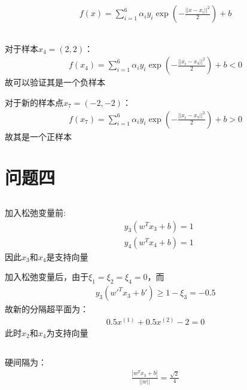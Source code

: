 \documentclass[12pt, a4paper]{article}
\begin{document}
\subsection{}

\begin{align*}
    f(x)=\sum_{i=1}^6 \alpha_i y_i \exp(-\frac{||x-x_i||^2}{2}) +b
\end{align*}

\subsection{}

对于样本$x_4=(2,2)$：
\begin{align*}
    f(x_4)=\sum_{i=1}^{6}\alpha_i y_i \exp(-\frac{||x_i-x_4||^2}{2})+b<0 
\end{align*}
故可以验证其是一个负样本

对于新的样本点$x_7=(-2,-2)$：
\begin{align*}
    f(x_7)=\sum_{i=1}^{6}\alpha_i y_i \exp(-\frac{||x_i-x_7||^2}{2})+b>0
\end{align*}
故其是一个正样本


\section{问题四}


\subsection{}

加入松弛变量前:
\begin{align*}
    &y_3(w^T x_3+b)=1\\
    &y_4(w^T x_4+b)=1
\end{align*}
因此$x_3$和$x_4$是支持向量

加入松弛变量后，由于$\xi_1=\xi_2=\xi_4=0$，而
\begin{align*}
    y_3({w'}^T x_3+b')\geq 1-\xi_3=-0.5
\end{align*}
故新的分隔超平面为：
\begin{align*}
    0.5x^{(1)}+0.5x^{(2)}-2=0
\end{align*}
此时$x_2$和$x_4$为支持向量

\subsection{}

硬间隔为：
\begin{align*}
    \frac{|w^Tx_3+b|}{||w||}=\frac{\sqrt{2}}{4}
\end{align*}
\end{document}
